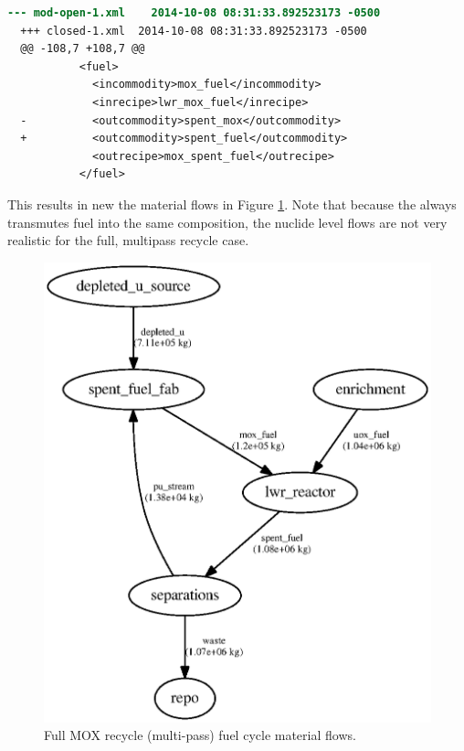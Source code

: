 \begin{lstlisting}[language=diff]
  --- mod-open-1.xml	2014-10-08 08:31:33.892523173 -0500
  +++ closed-1.xml	2014-10-08 08:31:33.892523173 -0500
  @@ -108,7 +108,7 @@
           <fuel>         
             <incommodity>mox_fuel</incommodity>
             <inrecipe>lwr_mox_fuel</inrecipe>
  -          <outcommodity>spent_mox</outcommodity>
  +          <outcommodity>spent_fuel</outcommodity>
             <outrecipe>mox_spent_fuel</outrecipe>
           </fuel>
\end{lstlisting}

This results in new the material flows in Figure \ref{fig:flow-closed}. Note
that because the  always transmutes fuel into the same
composition, the nuclide level flows are not very realistic for the full, multipass
recycle case.

\begin{figure}[!]
\label{fig:flow-closed}
\caption{Full MOX recycle (multi-pass) fuel cycle material flows.}
\begin{center}
\includegraphics{./images/flow-closed-1.eps}
\end{center}
\end{figure}

